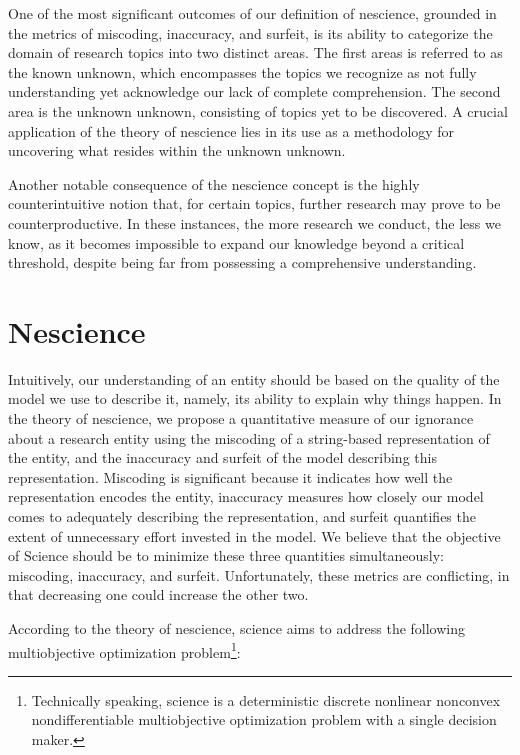 One of the most significant outcomes of our definition of nescience, grounded in the metrics of miscoding, inaccuracy, and surfeit, is its ability to categorize the domain of research topics into two distinct areas. The first areas is referred to as the known unknown, which encompasses the topics we recognize as not fully understanding yet acknowledge our lack of complete comprehension. The second area is the unknown unknown, consisting of topics yet to be discovered. A crucial application of the theory of nescience lies in its use as a methodology for uncovering what resides within the unknown unknown.

Another notable consequence of the nescience concept is the highly counterintuitive notion that, for certain topics, further research may prove to be counterproductive. In these instances, the more research we conduct, the less we know, as it becomes impossible to expand our knowledge beyond a critical threshold, despite being far from possessing a comprehensive understanding.

%
%

\section{Nescience}

Intuitively, our understanding of an entity should be based on the quality of the model we use to describe it, namely, its ability to explain why things happen. In the theory of nescience, we propose a quantitative measure of our ignorance about a research entity using the miscoding of a string-based representation of the entity, and the inaccuracy and surfeit of the model describing this representation. Miscoding is significant because it indicates how well the representation encodes the entity, inaccuracy measures how closely our model comes to adequately describing the representation, and surfeit quantifies the extent of unnecessary effort invested in the model. We believe that the objective of Science should be to minimize these three quantities simultaneously: miscoding, inaccuracy, and surfeit. Unfortunately, these metrics are conflicting, in that decreasing one could increase the other two.

According to the theory of nescience, science aims to address the following multiobjective optimization problem\footnote{Technically speaking, science is a deterministic discrete nonlinear nonconvex nondifferentiable multiobjective optimization problem with a single decision maker.}:

